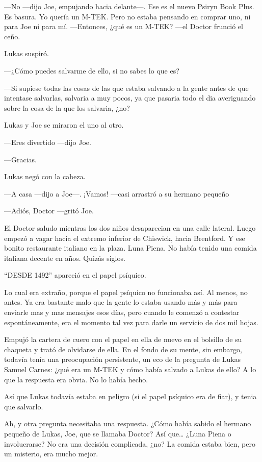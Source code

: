 ---No ---dijo Joe, empujando hacia delante---. Ese es el nuevo Psiryn
Book Plus. Es basura. Yo quería un M-TEK. Pero no estaba pensando en
comprar uno, ni para Joe ni para mí. ---Entonces, ¿qué es un M-TEK?
---el Doctor frunció el ceño.

Lukas suspiró.

---¿Cómo puedes salvarme de ello, si no sabes lo que es?

---Si supiese todas las cosas de las que estaba salvando a la gente
antes de que intentase salvarlas, salvaria a muy pocos, ya que pasaria
todo el dia averiguando sobre la cosa de la que los salvaria, ¿no?

Lukas y Joe se miraron el uno al otro.

---Eres divertido ---dijo Joe.

---Gracias.

Lukas negó con la cabeza.

---A casa ---dijo a Joe---. ¡Vamos! ---casi arrastró a su hermano
pequeño

---Adiós, Doctor ---gritó Joe.

El Doctor saludo mientras los dos niños desaparecian en una calle
lateral. Luego empezó a vagar hacia el extremo inferior de Chiswick,
hacia Brentford. Y ese bonito restaurante italiano en la plaza. Luna
Piena. No había tenido una comida italiana decente en años. Quizás
siglos.

``DESDE 1492'' apareció en el papel psíquico.

Lo cual era extraño, porque el papel psíquico no funcionaba así. Al
menos, no antes. Ya era bastante malo que la gente lo estaba usando más
y más para enviarle mas y mas mensajes esos días, pero cuando le comenzó
a contestar espontáneamente, era el momento tal vez para darle un
servicio de dos mil hojas.

Empujó la cartera de cuero con el papel en ella de nuevo en el bolsillo
de su chaqueta y trató de olvidarse de ella. En el fondo de su mente,
sin embargo, todavía tenía una preocupación persistente, un eco de la
pregunta de Lukas Samuel Carnes: ¿qué era un M-TEK y cómo había salvado
a Lukas de ello? A lo que la respuesta era obvia. No lo había hecho.

Así que Lukas todavía estaba en peligro (si el papel psíquico era de
fiar), y tenia que salvarlo.

Ah, y otra pregunta necesitaba una respuesta. ¿Cómo había sabido el
hermano pequeño de Lukas, Joe, que se llamaba Doctor? Así que\ldots{}
¿Luna Piena o involucrarse? No era una decisión complicada, ¿no? La
comida estaba bien, pero un misterio, era mucho mejor.

